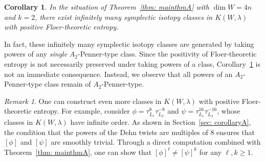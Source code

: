\documentclass[12pt]{article}
\renewcommand{\ge}{\geqslant}
\theoremstyle{theorem}
\newtheorem{CorollaryA}{Corollary}
\theoremstyle{definition}
\theoremstyle{remark}
\newtheorem{remark}[theorem]{Remark}
\numberwithin{equation}{section}
\begin{document}
\begin{CorollaryA}\label{cor: corollaryA}
In the situation of Theorem~\ref{thm: mainthmA} with $\dim W=4n$ and $k=2$, there exist infinitely many symplectic isotopy classes in $K(W,\lambda)$ with positive Floer-theoretic entropy.
\end{CorollaryA}

In fact, these infinitely many symplectic isotopy classes are generated by taking powers of any \emph{single} $A_2$-Penner-type class.
Since the positivity of Floer-theoretic entropy is not necessarily preserved under taking powers of a class, Corollary~\ref{cor: corollaryA} is not an immediate consequence.
Instead, we observe that all powers of an $A_2$-Penner-type class remain of $A_2$-Penner-type.
\begin{remark}
One can construct even more classes in $K(W,\lambda)$ with positive Floer-theoretic entropy.
For example, consider $\phi=\tau_{L_1}^8\tau_{L_2}^{-8}$ and $\psi=\tau_{L_1}^{16}\tau_{L_2}^{-16}$, whose classes in $K(W,\lambda)$ have infinite order.
As shown in Section~\ref{sec: corollaryA}, the condition that the powers of the Dehn twists are multiples of 8 ensures that $[\phi]$ and $[\psi]$ are smoothly trivial.
Through a direct computation combined with Theorem~\ref{thm: mainthmA}, one can show that $[\phi]^\ell\ne [\psi]^k$ for any $\ell,k\ge 1$.
\end{remark}
\end{document}
